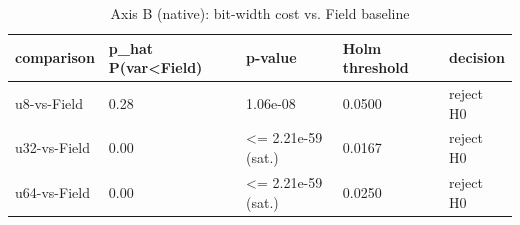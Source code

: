 \begin{table}[htbp]
\centering
\caption{Axis B (native): bit-width cost vs. Field baseline}
\label{tab:axis-b-native}
\begin{tabular}{lllll}
\toprule
comparison & p_hat P(var<Field) & p-value & Holm threshold & decision \\
\midrule
u8-vs-Field & 0.28 & 1.06e-08 & 0.0500 & reject H0 \\
u32-vs-Field & 0.00 & <= 2.21e-59 (sat.) & 0.0167 & reject H0 \\
u64-vs-Field & 0.00 & <= 2.21e-59 (sat.) & 0.0250 & reject H0 \\
\bottomrule
\end{tabular}
\end{table}
